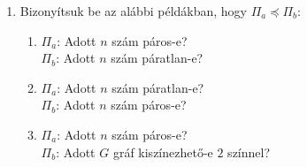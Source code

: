\documentclass[a4paper, 12pt]{article}
\begin{document}
        \noindent{}
        \noindent{}
        
        
        \begin{enumerate}
            
            \item Bizonyítsuk be az alábbi példákban, hogy $\Pi_a \preceq \Pi_b$:
            \begin{enumerate}
                \item $\Pi_a$: Adott $n$ szám páros-e? \\
                $\Pi_b$: Adott $n$ szám páratlan-e?

                \item $\Pi_a$: Adott $n$ szám páratlan-e? \\
                $\Pi_b$: Adott $n$ szám páros-e?

                \item $\Pi_a$: Adott $n$ szám páros-e? \\
                $\Pi_b$: Adott $G$ gráf kiszínezhető-e $2$ színnel?


\end{enumerate}
\end{enumerate}
\end{document}
